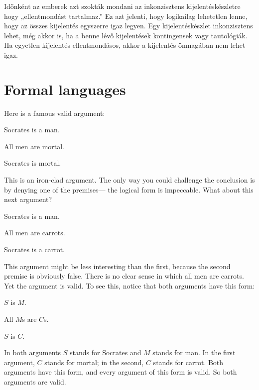 Időnként az emberek azt szokták mondani az inkonzisztens kijelentéskészletre hogy „ellentmondást tartalmaz.” Ez azt jelenti, hogy logikailag lehetetlen lenne, hogy az összes kijelentés egyszerre igaz legyen. Egy kijelentéskészlet inkonzisztens lehet, még akkor is, ha a benne lévő kijelentések kontingensek vagy tautológiák. Ha egyetlen kijelentés ellentmondásos, akkor a kijelentés önmagában nem lehet igaz.



\section{Formal languages}

Here is a famous valid argument:
\begin{earg}
\item[] Socrates is a man.
\item[] All men are mortal.
\item[\therefore] Socrates is mortal.
\end{earg}
This is an iron-clad argument. The only way you could challenge the conclusion is by denying one of the premises--- the logical form is impeccable. What about this next argument?

\begin{earg}
\item[] Socrates is a man.
\item[] All men are carrots.
\item[\therefore] Socrates is a carrot.
\end{earg}

This argument might be less interesting than the first, because the second premise is obviously false. There is no clear sense in which all men are carrots. Yet the argument is valid. To see this, notice that both arguments have this form:

\begin{earg}
\item[] $S$ is $M$.
\item[] All $M$s are $C$s.
\item[\therefore] $S$ is $C$.
\end{earg}

In both arguments $S$ stands for Socrates and $M$ stands for man. In the first argument, $C$ stands for mortal; in the second, $C$ stands for carrot. Both arguments have this form, and every argument of this form is valid. So both arguments are valid.



